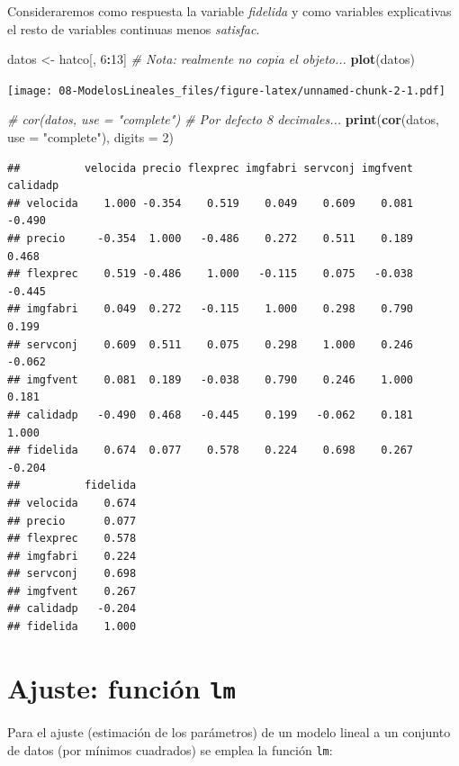 \documentclass[]{book}
\newenvironment{Shaded}{\begin{snugshade}}{\end{snugshade}}
\newcommand{\KeywordTok}[1]{\textcolor[rgb]{0.13,0.29,0.53}{\textbf{#1}}}
\newcommand{\DataTypeTok}[1]{\textcolor[rgb]{0.13,0.29,0.53}{#1}}
\newcommand{\DecValTok}[1]{\textcolor[rgb]{0.00,0.00,0.81}{#1}}
\newcommand{\StringTok}[1]{\textcolor[rgb]{0.31,0.60,0.02}{#1}}
\newcommand{\CommentTok}[1]{\textcolor[rgb]{0.56,0.35,0.01}{\textit{#1}}}
\newcommand{\OperatorTok}[1]{\textcolor[rgb]{0.81,0.36,0.00}{\textbf{#1}}}
\newcommand{\NormalTok}[1]{#1}
\begin{document}
Consideraremos como respuesta la variable \emph{fidelida} y como
variables explicativas el resto de variables continuas menos
\emph{satisfac}.

\begin{Shaded}
\begin{Highlighting}[]
\NormalTok{datos <-}\StringTok{ }\NormalTok{hatco[, }\DecValTok{6}\OperatorTok{:}\DecValTok{13}\NormalTok{]  }\CommentTok{# Nota: realmente no copia el objeto...}
\KeywordTok{plot}\NormalTok{(datos)}
\end{Highlighting}
\end{Shaded}

\texttt{[image: 08-ModelosLineales\_files/figure-latex/unnamed-chunk-2-1.pdf]}

\begin{Shaded}
\begin{Highlighting}[]
\CommentTok{# cor(datos, use = "complete") # Por defecto 8 decimales...}
\KeywordTok{print}\NormalTok{(}\KeywordTok{cor}\NormalTok{(datos, }\DataTypeTok{use =} \StringTok{"complete"}\NormalTok{), }\DataTypeTok{digits =} \DecValTok{2}\NormalTok{)}
\end{Highlighting}
\end{Shaded}

\begin{verbatim}
##          velocida precio flexprec imgfabri servconj imgfvent calidadp
## velocida    1.000 -0.354    0.519    0.049    0.609    0.081   -0.490
## precio     -0.354  1.000   -0.486    0.272    0.511    0.189    0.468
## flexprec    0.519 -0.486    1.000   -0.115    0.075   -0.038   -0.445
## imgfabri    0.049  0.272   -0.115    1.000    0.298    0.790    0.199
## servconj    0.609  0.511    0.075    0.298    1.000    0.246   -0.062
## imgfvent    0.081  0.189   -0.038    0.790    0.246    1.000    0.181
## calidadp   -0.490  0.468   -0.445    0.199   -0.062    0.181    1.000
## fidelida    0.674  0.077    0.578    0.224    0.698    0.267   -0.204
##          fidelida
## velocida    0.674
## precio      0.077
## flexprec    0.578
## imgfabri    0.224
## servconj    0.698
## imgfvent    0.267
## calidadp   -0.204
## fidelida    1.000
\end{verbatim}

\section{\texorpdfstring{Ajuste: función
\texttt{lm}}{Ajuste: función lm}}\label{ajuste-funcion-lm}

Para el ajuste (estimación de los parámetros) de un modelo lineal a un
conjunto de datos (por mínimos cuadrados) se emplea la función
\texttt{lm}:
\end{document}
